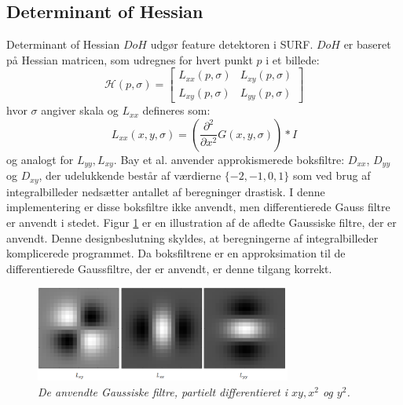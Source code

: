 \subsection{Determinant of Hessian}
Determinant of Hessian $DoH$ udgør feature detektoren i SURF. $DoH$ er baseret på Hessian matricen, som udregnes for hvert punkt $p$ i et billede:
\begin{equation}
\mathcal{H}(p, \sigma) = 
 \begin{bmatrix}
 	L_{xx}(p, \sigma) & L_{xy}(p, \sigma) \\
 	L_{xy}(p, \sigma) & L_{yy}(p, \sigma) 
 \end{bmatrix}
 \label{hessianmatrix}
\end{equation}
hvor $\sigma$ angiver skala og $L_{xx}$ defineres som: 
\begin{equation}
L_{xx}(x,y, \sigma) = (\frac{\partial^2 }{\partial x^2 } G(x,y,\sigma)) * I
\label{lxx}
\end{equation}
og analogt for $L_{yy}, L_{xy}$. Bay et al. anvender approkismerede boksfiltre: $D_{xx}$, $D_{yy}$ og $D_{xy}$, der udelukkende består af værdierne $\lbrace-2,-1,0, 1\rbrace$ som ved brug af integralbilleder nedsætter antallet af beregninger drastisk. I denne implementering er disse boksfiltre ikke anvendt, men differentierede Gauss filtre er anvendt i stedet. Figur \ref{fig:lxxlyylxy} er en illustration af de afledte Gaussiske filtre, der er anvendt. Denne designbeslutning skyldes, at beregningerne af integralbilleder komplicerede programmet. Da 
boksfiltrene er en approksimation til de differentierede Gaussfiltre, der er anvendt, er denne tilgang korrekt.
\begin{figure}[H]
    \centering
    \includegraphics[width=0.75\textwidth]{fig/31.png}
     \vspace{-0.5em}
    \begin{center}    
       \caption{{\footnotesize \textit{De anvendte Gaussiske filtre, partielt differentieret i $xy,x^2$ og $y^2$.}}}
    \label{fig:lxxlyylxy}
     \end{center}
     \vspace{-2.5em}
  \end{figure} \noindent
